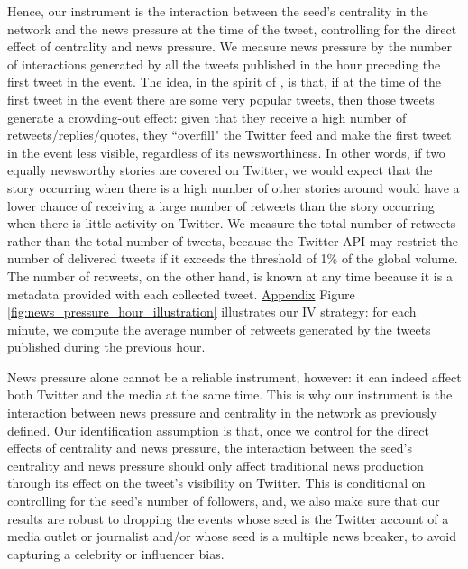 Hence, our instrument is the interaction between the seed's centrality in the network and the news pressure at the time of the tweet, controlling for the direct effect of centrality and news pressure. We measure news pressure by the number of interactions generated by all the tweets published in the hour preceding the first tweet in the event. The idea, in the spirit of \citet{EisenseeStromberg2007}, is that, if at the time of the first tweet in the event there are some very popular tweets, then those tweets generate a crowding-out effect: given that they receive a high number of retweets/replies/quotes, they ``overfill" the Twitter feed and make the first tweet in the event less visible, regardless of its newsworthiness. In other words, if two equally newsworthy stories are covered on Twitter, we would expect that the story occurring when there is a high number of other stories around would have a lower chance of receiving a large number of retweets than the story occurring when there is little activity on Twitter. We measure the total number of retweets rather than the total number of tweets, because the Twitter API may restrict the number of delivered tweets if it exceeds the threshold of 1\% of the global volume. The number of retweets, on the other hand, is known at any time because it is a metadata provided with each collected tweet. \hyperlink{ref:Appendix}{Appendix} Figure \ref{fig:news_pressure_hour_illustration} illustrates our IV strategy: for each minute, we compute the average number of retweets generated by the tweets published during the previous hour.
 
News pressure alone cannot be a reliable instrument, however: it can indeed affect both Twitter and the media at the same time. This is why our instrument is the interaction between news pressure and centrality in the network as previously defined. Our identification assumption is that, once we control for the direct effects of centrality and news pressure, the interaction between the seed's centrality and news pressure should only affect traditional news production through its effect on the tweet's visibility on Twitter. This is conditional on controlling for the seed's number of followers, and, we also make sure that our results are robust to dropping the events whose seed is the Twitter account of a media outlet or journalist and/or whose seed is a multiple news breaker, to avoid capturing a celebrity or influencer bias.

